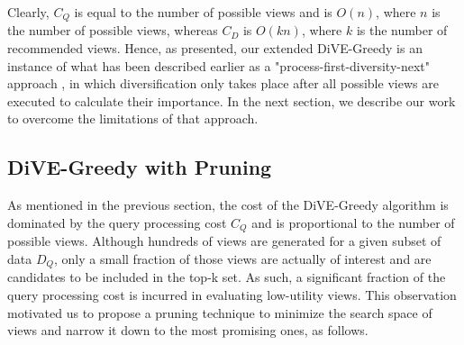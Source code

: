 Clearly, $C_Q$ is equal to the number of possible views and is $O(n)$, where $n$ is the number of possible views, whereas $C_D$ is $O(kn)$, where $k$ is the number of recommended views.
%
Hence, as presented, our extended DiVE-Greedy is an instance of what has been described earlier as a "process-first-diversity-next" approach \cite{Zhang2008,Rafiei2010}, in which diversification only takes place after all possible views are executed to calculate their importance. 
%
In the next section, we describe our work to overcome the limitations of that approach.

\subsection{DiVE-Greedy with Pruning}\label{dive-greedy-static}

As mentioned in the previous section, the cost of the DiVE-Greedy algorithm is dominated by the query processing cost $C_Q$ and is proportional to the number of possible views. 
%
Although hundreds of views are generated for a given subset of data $D_Q$, only a small fraction of those views are actually of interest and are candidates to be included in the top-k set. 
%
As such, a significant fraction of the query processing cost is incurred in evaluating low-utility views. 
%
This observation motivated us to propose a pruning technique to minimize the search space of views and narrow it down to the most promising ones, as follows. 




